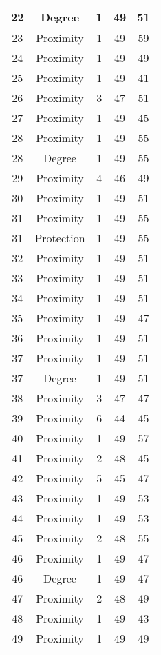 \documentclass[results.tex]{subfiles}
\begin{document}
\begin{center}
\begin{tabular}{| c || c | c | c | c |}
    \hline
    22 & Degree & 1 & 49 & 51 \\ 
    \hline
    23 & Proximity & 1 & 49 & 59 \\ 
    \hline
    24 & Proximity & 1 & 49 & 49 \\ 
    \hline
    25 & Proximity & 1 & 49 & 41 \\ 
    \hline
    26 & Proximity & 3 & 47 & 51 \\ 
    \hline
    27 & Proximity & 1 & 49 & 45 \\ 
    \hline
    28 & Proximity & 1 & 49 & 55 \\ 
    \hline
    28 & Degree & 1 & 49 & 55 \\ 
    \hline
    29 & Proximity & 4 & 46 & 49 \\ 
    \hline
    30 & Proximity & 1 & 49 & 51 \\ 
    \hline
    31 & Proximity & 1 & 49 & 55 \\ 
    \hline
    31 & Protection & 1 & 49 & 55 \\ 
    \hline
    32 & Proximity & 1 & 49 & 51 \\ 
    \hline
    33 & Proximity & 1 & 49 & 51 \\ 
    \hline
    34 & Proximity & 1 & 49 & 51 \\ 
    \hline
    35 & Proximity & 1 & 49 & 47 \\ 
    \hline
    36 & Proximity & 1 & 49 & 51 \\ 
    \hline
    37 & Proximity & 1 & 49 & 51 \\ 
    \hline
    37 & Degree & 1 & 49 & 51 \\ 
    \hline
    38 & Proximity & 3 & 47 & 47 \\ 
    \hline
    39 & Proximity & 6 & 44 & 45 \\ 
    \hline
    40 & Proximity & 1 & 49 & 57 \\ 
    \hline
    41 & Proximity & 2 & 48 & 45 \\ 
    \hline
    42 & Proximity & 5 & 45 & 47 \\ 
    \hline
    43 & Proximity & 1 & 49 & 53 \\ 
    \hline
    44 & Proximity & 1 & 49 & 53 \\ 
    \hline
    45 & Proximity & 2 & 48 & 55 \\ 
    \hline
    46 & Proximity & 1 & 49 & 47 \\ 
    \hline
    46 & Degree & 1 & 49 & 47 \\ 
    \hline
    47 & Proximity & 2 & 48 & 49 \\ 
    \hline
    48 & Proximity & 1 & 49 & 43 \\ 
    \hline
    49 & Proximity & 1 & 49 & 49 \\ 
    \hline   \end{tabular}
\end{center}
\end{document}
